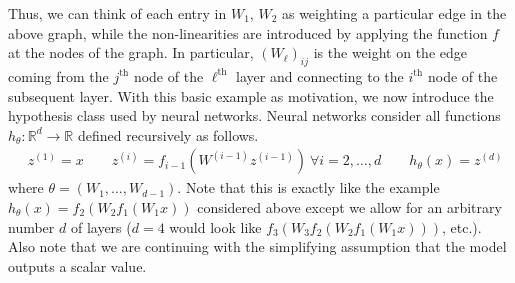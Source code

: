\documentclass[12pt]{article}
\newcommand{\R}{\mathcal{R}}
\def\R{\mathbb{R}}
\begin{document}


\bigskip

Thus, we can think of each entry in $W_1$, $W_2$ as weighting a particular edge in the above graph, while the non-linearities are introduced by applying the function $f$ at the nodes
of the graph. In particular, $(W_\ell)_{ij}$ is the weight on the edge coming from the $j^{\text{th}}$ node of the $\ell^{\text{th}}$ layer and connecting to the $i^{\text{th}}$ node of the 
subsequent layer. With this basic example as motivation, we now introduce the hypothesis class used by neural networks. Neural networks consider all functions $h_\theta: \R^d \to \R$
defined recursively as follows. 
\begin{align*}
&z^{(1)} = x \qquad z^{(i)} = f_{i - 1}(W^{(i - 1)} z^{(i - 1)}) \ \forall i = 2, \dots, d \qquad h_\theta(x) = z^{(d)}
\end{align*}
where $\theta = (W_1, \dots, W_{d - 1})$. Note that this is exactly like the example $h_\theta(x) = f_2(W_2 f_1(W_1 x))$ considered above except we allow for an arbitrary number 
$d$ of layers ($d = 4$ would look like $f_3(W_3f_2(W_2 f_1(W_1 x)))$, etc.). Also note that we are continuing with the simplifying assumption that the model outputs a scalar value. 
\end{document}
